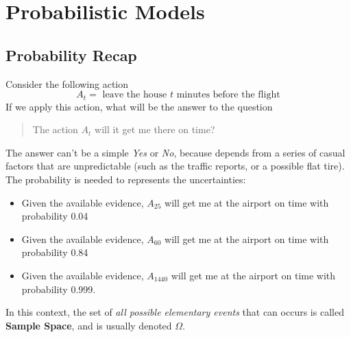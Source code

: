 \documentclass[10pt, letterpaper]{report}
\begin{document}
\chapter{Probabilistic Models}
\section{Probability Recap}
Consider the following action\begin{equation}
	A_t=\text{ leave the house $t$ minutes before the flight}
\end{equation}
If we apply this action, what will be the answer to the question\begin{quote}
	The action $A_t$ will it get me there on time?
\end{quote}
The answer can't be a simple \textit{Yes} or \textit{No}, because depends from a series of casual factors that are unpredictable (such as the traffic reports, or a possible flat tire). The probability is needed to represents the uncertainties:\begin{itemize}
	\item Given the available evidence, $A_{25}$ will get me at the airport on time with
	      probability 0.04
	\item Given the available evidence, $A_{60}$ will get me at the airport on time with
	      probability 0.84
	\item Given the available evidence, $A_{1440}$ will get me at the airport on time with
	      probability 0.999.
\end{itemize}
In this context, the set of \textit{all possible elementary events} that can occurs is called \textbf{Sample Space}, and is usually denoted $\Omega$.
\end{document}
